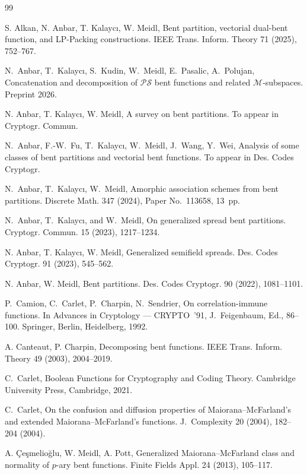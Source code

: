 \documentclass[12pt]{article}
\theoremstyle{plain}
\theoremstyle{definition}
\begin{document}
	\begin{thebibliography}{99}
		
		
		 S. Alkan, N. Anbar, T. Kalayc\i, W. Meidl, Bent partition, vectorial dual-bent function, and LP-Packing constructions. IEEE Trans. Inform. Theory 71 (2025), 752--767. 
		
		 N.~Anbar, T.~Kalayc\i, S.~Kudin, W.~Meidl, E.~Pasalic, A.~Polujan,
		{Concatenation and decomposition of \(\mathcal{PS}\) bent functions and related \(\mathcal{M}\)-subspaces}. Preprint 2026. 
		
		 N. Anbar, T. Kalayc\i, W. Meidl, A survey on bent partitions. To appear in Cryptogr. Commun.
		
		N.~Anbar, F.-W.~Fu, T.~Kalaycı, W.~Meidl, J.~Wang, Y.~Wei,
		Analysis of some classes of bent partitions and vectorial bent functions. To appear in Des. Codes Cryptogr.
		
		 N.~Anbar, T.~Kalayc{\i}, W.~Meidl,
		Amorphic association schemes from bent partitions.
		Discrete Math. 347 (2024), Paper No.~113658, 13~pp.
		
		 N.~Anbar, T.~Kalaycı, and W.~Meidl,
		On generalized spread bent partitions.
		Cryptogr. Commun. 15 (2023), 1217--1234.
		
		
		 N. Anbar, T. Kalayc\i, W. Meidl, Generalized semifield spreads. Des. Codes Cryptogr. 91 (2023), 545--562. 
		
		 N. Anbar, W. Meidl, Bent partitions. Des. Codes Cryptogr. 90 (2022), 1081--1101. 
		
		 P.~Camion, C.~Carlet, P.~Charpin, N.~Sendrier, On correlation-immune functions.
		In Advances in Cryptology --- CRYPTO~'91, J.~Feigenbaum, Ed., 86--100.
		Springer, Berlin, Heidelberg, 1992.
		
		 A. Canteaut, P. Charpin, Decomposing bent functions. IEEE Trans. Inform. Theory 49
		(2003), 2004--2019.
		
		 C.~Carlet, Boolean Functions for Cryptography and Coding Theory. Cambridge University Press, Cambridge, 2021.
		
		 C.~Carlet,
		On the confusion and diffusion properties of Maiorana--McFarland’s
		and extended Maiorana--McFarland’s functions.
		J.\ Complexity 20 (2004), 182--204 (2004).
		
		 A. \c Ce\c smelio\u glu, W. Meidl, A. Pott, Generalized Maiorana--McFarland class and normality of $p$-ary bent functions.
		Finite Fields Appl. 24 (2013), 105--117.
		

\end{thebibliography}
\end{document}
